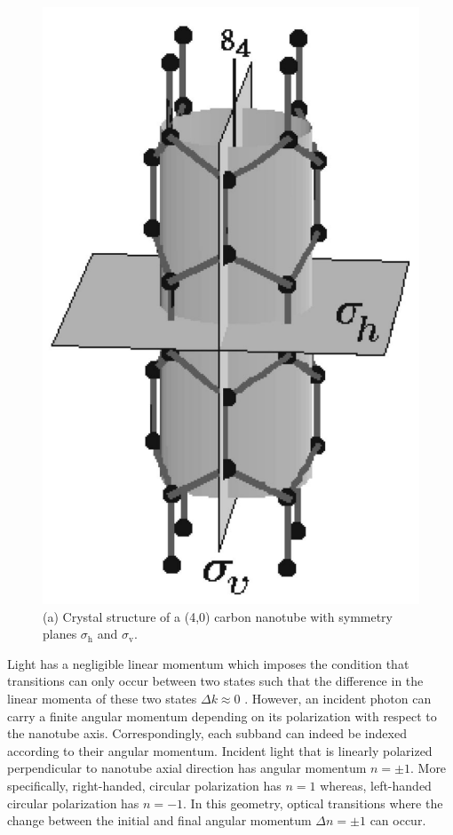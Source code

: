  \begin{figure}[ht]
 	\centering
 	\includegraphics[scale=0.15]{images/chapter_optical_props/cnt_symmetry_bozovic}
 	\caption{(a) Crystal structure of a (4,0) carbon nanotube with symmetry planes $\sigma_\text{h}$ and $\sigma_\text{v}$.}
 	\label{fig:cnt_symmetries}
 \end{figure}

 Light has a negligible linear momentum which imposes the condition that transitions can only occur between two states such that the difference in the linear momenta of these two states $\Delta k \approx 0 $ \cite{bovzovic2000optical}. However, an incident photon can carry a finite angular momentum depending on its polarization with respect to the nanotube axis. Correspondingly, each subband can indeed be indexed according to their angular momentum. Incident light that is linearly polarized perpendicular to nanotube axial direction has angular momentum $n = \pm 1$. More specifically, right-handed, circular polarization has $n = 1$ whereas, left-handed circular polarization has $n = -1$. In this geometry, optical transitions where the change between the initial and final angular momentum $\Delta n = \pm 1$ can occur.


